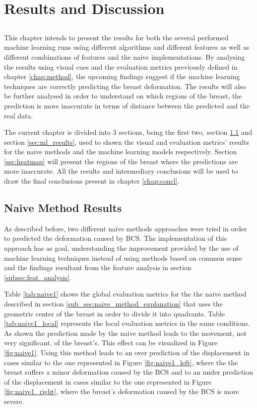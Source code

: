 \chapter{Results and Discussion}\label{chap:results}

\section*{}

This chapter intends to present the results for both the several performed machine learning runs using different algorithms and different features as well as different combinations of features and the naive implementations. By analysing the results using visual cues and the evaluation metrics previously defined in chapter \ref{chap:method}, the upcoming findings suggest if the machine learning techniques are correctly predicting the breast deformation. The results will also be further analysed in order to understand on which regions of the breast, the prediction is more inaccurate in terms of distance between the predicted and the real data. 

The current chapter is divided into 3 sections, being the first two, section \ref{sec:naive_results} and section \ref{sec:ml_results}, used to shown the visual and evaluation metrics' results for the naive methods and the machine learning models respectively. Section \ref{sec:heatmap} will present the regions of the breast where the predictions are more inaccurate.
All the results and intermediary conclusions will be used to draw the final conclusions present in chapter \ref{chap:concl}.

\section{Naive Method Results} \label{sec:naive_results}

As described before, two different naive methods approaches were tried in order to predicted the deformation caused by BCS. The implementation of this approach has as goal, understanding the improvement provided by the use of machine learning techniques instead of using methods based on common sense and the findings resultant from the feature analysis in section \ref{subsec:feat_analysis}.

Table \ref{tab:naive1} shows the global evaluation metrics for the the naive method described in section \ref{sub_sec:naive_method_explanation} that uses the geometric center of the breast in order to divide it into quadrants. Table \ref{tab:naive1_local} represents the local evaluation metrics in the same conditions. As shown the prediction made by the naive method leads to the movement, not very significant, of the breast's. This effect can be visualized in Figure \ref{fig:naive1}. Using this method leads to an over prediction of the displacement in cases similar to the one represented in Figure \ref{fig:naive1_left}, where the the breast suffers a minor deformation caused by the BCS and to an under prediction of the displacement in cases similar to the one represented in Figure \ref{fig:naive1_right}, where the breast's deformation caused by the BCS is more severe. 

